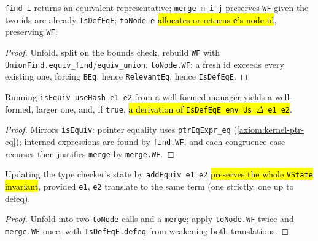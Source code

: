 \begin{lemma}
\label{fam:eqvmgr-primitives-wf}
\leanok
{}
 \texttt{find i} returns an equivalent representative; \texttt{merge m i j} preserves
\texttt{WF} given the two ids are already \texttt{IsDefEqE}; \texttt{toNode e} \hl{allocates or
returns \texttt{e}'s node id}, preserving \texttt{WF}.
\end{lemma}
\begin{proof}
\leanok
{} Unfold, split on the bounds check, rebuild \texttt{WF} with
\texttt{UnionFind.equiv\_find}/\texttt{equiv\_union}. \texttt{toNode.WF}: a fresh id exceeds every
existing one, forcing \texttt{BEq}, hence \texttt{RelevantEq}, hence \texttt{IsDefEqE}.
\end{proof}

\begin{theorem}
\label{thm:eqvmgr-isequiv-wf}
\leanok
{}
 Running \texttt{isEquiv useHash e1 e2} from a well-formed manager yields a
well-formed, larger one, and, if \texttt{true}, \hl{a derivation of \texttt{IsDefEqE env Us $\Delta$
e1 e2}}.
\end{theorem}
\begin{proof}
\leanok
{} Mirrors \texttt{isEquiv}: pointer equality uses \texttt{ptrEqExpr\_eq}
(\ref{axiom:kernel-ptr-eq}); interned expressions are found by \texttt{find.WF}, and each congruence
case recurses then justifies \texttt{merge} by \texttt{merge.WF}.
\end{proof}

\begin{theorem}
\label{thm:eqvmgr-addequiv-wf}
\leanok
{}
 Updating the type checker's state by \texttt{addEquiv e1 e2} \hl{preserves the whole
\texttt{VState} invariant}, provided \texttt{e1}, \texttt{e2} translate to the same term (one strictly,
one up to defeq).
\end{theorem}
\begin{proof}
\leanok
{} Unfold into two \texttt{toNode} calls and a \texttt{merge}; apply \texttt{toNode.WF}
twice and \texttt{merge.WF} once, with \texttt{IsDefEqE.defeq} from weakening both translations.
\end{proof}

